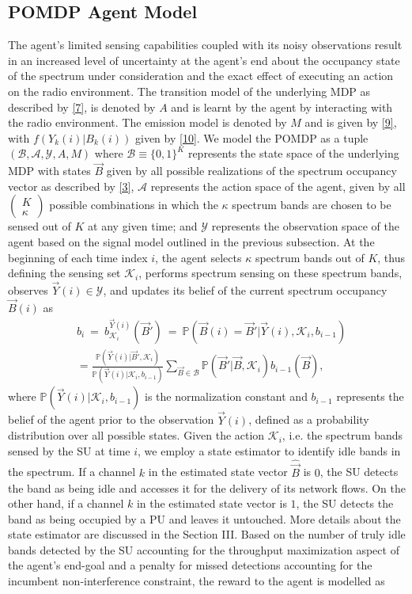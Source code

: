 \documentclass[10pt,twocolumn]{IEEEtran}
\begin{document}
\subsection{POMDP Agent Model}
The agent's limited sensing capabilities coupled with its noisy observations result in an increased level of uncertainty at the agent's end about the occupancy state of the spectrum under consideration and the exact effect of executing an action on the radio environment. The transition model of the underlying MDP as described by \eqref{7}, is denoted by $A$ and is learnt by the agent by interacting with the radio environment. The emission model is denoted by $M$ and is given by \eqref{9}, with $f(Y_k(i)|B_k(i))$ given by \eqref{10}. We model the POMDP as a tuple $(\mathcal B,\mathcal{A},\mathcal{Y},A,M)$ where $\mathcal{B}\equiv\{0,1\}^K$ represents the state space of the underlying MDP with states $\vec{B}$ given by all possible realizations of the spectrum occupancy vector as described by \eqref{3}, $\mathcal{A}$ represents the action space of the agent, given by all $\left(\begin{array}{c}K\\\kappa\end{array}\right)$ possible combinations in which the $\kappa$ spectrum bands are chosen to be sensed out of $K$ at any given time; and $\mathcal{Y}$ represents the observation space of the agent based on the signal model outlined in the previous subsection. At the beginning of each time index $i$, the agent selects $\kappa$ spectrum bands out of $K$, thus defining the sensing set $\mathcal K_i$, performs spectrum sensing  on these spectrum bands, observes $\vec{Y}(i)\in \mathcal{Y}$, and updates its belief of the current spectrum occupancy $\vec{B}(i)$ as 
\begin{align}\label{11}
&b_i\ =\ b_{\mathcal{K}_i}^{\vec{Y}(i)}(\vec{B}')\ =\ \mathbb{P}(\vec{B}(i)=\vec{B}'|\vec{Y}(i),\mathcal K_i,b_{i-1})\\&=
\nonumber
\frac{\mathbb{P}(\vec{Y}(i)|\vec{B}',\mathcal{K}_i)}{\mathbb{P}(\vec{Y}(i)|\mathcal{K}_i,b_{i-1})}\sum_{\vec{B} \in \mathcal{B}}\mathbb{P}(\vec{B}'|\vec{B},\mathcal{K}_i)b_{i-1}(\vec{B}),
\end{align}
where $\mathbb{P}(\vec{Y}(i)|\mathcal{K}_i,b_{i-1})$ is the normalization constant and $b_{i-1}$ represents the belief of the agent prior to the observation $\vec{Y}(i)$, defined as a probability distribution over all possible states. Given the action $\mathcal{K}_i$, i.e. the spectrum bands sensed by the SU at time $i$, we employ a state estimator to identify idle bands in the spectrum. If a channel $k$ in the estimated state vector $\hat{\vec{B}}$ is $0$, the SU detects the band as being idle and accesses it for the delivery of its network flows. On the other hand, if a channel $k$ in the estimated state vector is $1$, the SU detects the band as being occupied by a PU and leaves it untouched. More details about the state estimator are discussed in the Section III. Based on the number of truly idle bands detected by the SU accounting for the throughput maximization aspect of the agent's end-goal and a penalty for missed detections accounting for the incumbent non-interference constraint, the reward to the agent is modelled as
\end{document}
